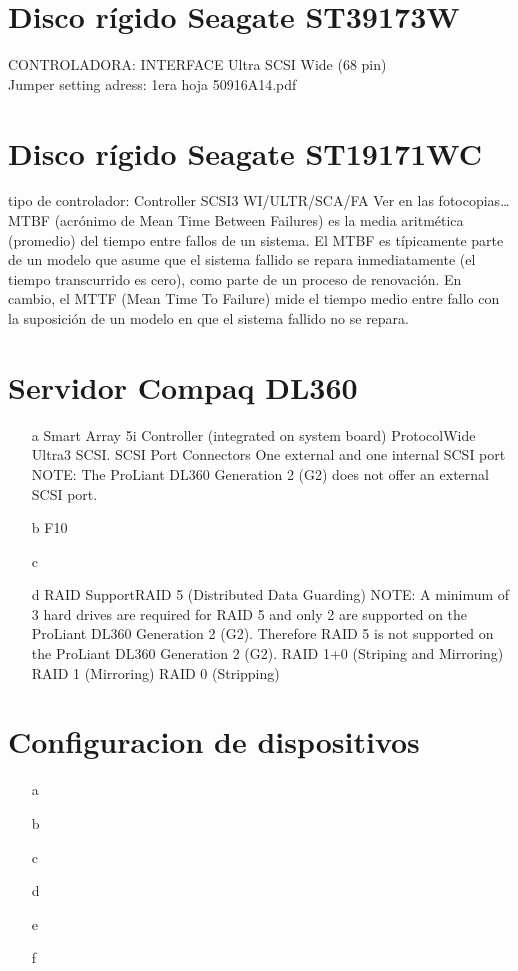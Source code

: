 \documentclass[a4paper]{article}
\begin{document}
%
\sffamily
%
\maketitle
%
% 
\section{Disco rígido Seagate ST39173W}
CONTROLADORA: INTERFACE Ultra SCSI Wide (68 pin)\\
Jumper setting adress: 1era hoja 50916A14.pdf
%
\section{Disco rígido Seagate ST19171WC}
tipo de controlador: Controller           SCSI3 WI/ULTR/SCA/FA 
Ver en las fotocopias…
\\
MTBF (acrónimo de Mean Time Between Failures) es la media aritmética (promedio) del tiempo entre fallos de un sistema. El MTBF es típicamente parte de un modelo que asume que el sistema fallido se repara inmediatamente (el tiempo transcurrido es cero), como parte de un proceso de renovación. En cambio, el MTTF (Mean Time To Failure) mide el tiempo medio entre fallo con la suposición de un modelo en que el sistema fallido no se repara.
%
\section{Servidor Compaq DL360}
\begin{enumerate}
\item[a] Smart Array 5i Controller 
(integrated on system board)
ProtocolWide Ultra3 SCSI. SCSI Port Connectors One external and one internal SCSI port
NOTE: The ProLiant DL360 Generation 2 (G2) does not offer an external SCSI port.
\item[b] F10
\item[c]
\item[d]RAID SupportRAID 5 (Distributed Data Guarding)
NOTE: A minimum of 3 hard drives are required for RAID 5 and only 2 are supported on the ProLiant DL360 Generation 2 (G2). Therefore RAID 5 is not supported on the ProLiant DL360 Generation 2 (G2). 
RAID 1+0 (Striping and Mirroring)
RAID 1 (Mirroring)
RAID 0 (Stripping)
\end{enumerate}
%
\section{Configuracion de dispositivos}
\begin{enumerate}
\item[a]
\item[b]
\item[c]
\item[d]
\item[e]
\item[f]
\end{enumerate}
%
\end{document}
